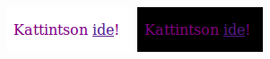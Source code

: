 \begin{frame}
  \begin{exampleblock}{}
    
  \end{exampleblock}
  \begin{columns}[T]
      \centering \includegraphics[width=\textwidth]{fejresz_vilagos.png}
      \centering \includegraphics[width=\textwidth]{fejresz_sotet.png}
  \end{columns} 
\end{frame}

